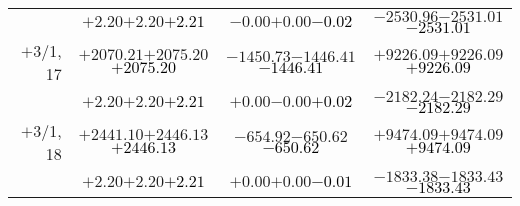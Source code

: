 \documentclass[compress]{beamer}
\begin{document}
\begin{frame}
{\begin{tabular}{r | c | c | c}
           & $+2.20$\hspace{0.1 cm}$+2.20$\hspace{0.1 cm}\textcolor{black}{$+2.21$} & $-0.00$\hspace{0.1 cm}$+0.00$\hspace{0.1 cm}\textcolor{black}{$-0.02$} & $-2530.96$\hspace{0.1 cm}$-2531.01$\hspace{0.1 cm}\textcolor{black}{$-2531.01$} \\
$+$3/1, 17 & $+2070.21$\hspace{0.1 cm}$+2075.20$\hspace{0.1 cm}\textcolor{black}{$+2075.20$} & $-1450.73$\hspace{0.1 cm}$-1446.41$\hspace{0.1 cm}\textcolor{black}{$-1446.41$} & $+9226.09$\hspace{0.1 cm}$+9226.09$\hspace{0.1 cm}\textcolor{black}{$+9226.09$} \\
           & $+2.20$\hspace{0.1 cm}$+2.20$\hspace{0.1 cm}\textcolor{black}{$+2.21$} & $+0.00$\hspace{0.1 cm}$-0.00$\hspace{0.1 cm}\textcolor{black}{$+0.02$} & $-2182.24$\hspace{0.1 cm}$-2182.29$\hspace{0.1 cm}\textcolor{black}{$-2182.29$} \\
$+$3/1, 18 & $+2441.10$\hspace{0.1 cm}$+2446.13$\hspace{0.1 cm}\textcolor{black}{$+2446.13$} & $-654.92$\hspace{0.1 cm}$-650.62$\hspace{0.1 cm}\textcolor{black}{$-650.62$} & $+9474.09$\hspace{0.1 cm}$+9474.09$\hspace{0.1 cm}\textcolor{black}{$+9474.09$} \\
           & $+2.20$\hspace{0.1 cm}$+2.20$\hspace{0.1 cm}\textcolor{black}{$+2.21$} & $+0.00$\hspace{0.1 cm}$+0.00$\hspace{0.1 cm}\textcolor{black}{$-0.01$} & $-1833.38$\hspace{0.1 cm}$-1833.43$\hspace{0.1 cm}\textcolor{black}{$-1833.43$} \\
\end{tabular}}
\end{frame}
\end{document}
